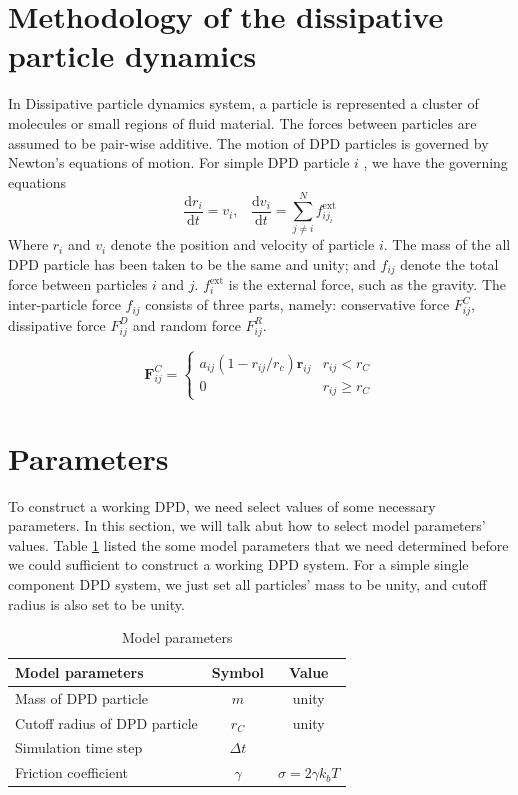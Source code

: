 \documentclass[12pt,a4paper]{article}   %
\begin{document}
\section{Methodology of the dissipative particle dynamics}     %
In Dissipative particle dynamics system, a particle is represented a cluster of molecules or small regions of fluid material. The forces between particles are assumed to be pair-wise additive. The motion of DPD particles is governed by Newton's equations of motion. For simple DPD particle $i$ , we have the governing equations
\begin{equation}
\frac{\mathrm{d}r_i}{\mathrm{d}t} = v_i,\,\,\,\,\,
\frac{\mathrm{d}v_i}{\mathrm{d}t} = \sum_{j\neq i}^N f_{ij_{i}}^{\mathrm{ext}}
\end{equation}
Where $r_i$ and $v_i$ denote the position and velocity of particle $i$. The mass of the all DPD particle has been taken to be the same and unity; and $f_{ij}$ denote the total force between particles $i$ and $j$. $f_i^{\mathrm{ext}}$ is the external force, such as the gravity. The inter-particle force $f_{ij}$ consists of three parts, namely: conservative force $F_{ij}^C$, dissipative force $F_{ij}^D$ and random force $F_{ij}^R$.

\begin{equation}
\mathbf{F}_{ij}^{C}=\begin{cases}
a_{ij}(1-r_{ij}/r_{c})\mathbf{\hat{r}}_{ij} & r_{ij}<r_{C}\\
0 & r_{ij}\geq r_{C}
\end{cases}
\end{equation}

\section{Parameters}

To construct a working DPD, we need select values of some necessary parameters. In this section, we will talk abut how to select model parameters' values. Table \ref{parameters} listed the some model parameters that we need determined before we could sufficient to construct a working DPD system. For a simple single component DPD system, we just set all particles' mass to be unity, and cutoff radius is also set to be unity.
\begin{table}[!htb]
\centering
\caption{\label{parameters}Model parameters}
\begin{tabular}{|l|l|l|}
\textbf{Model parameters} & \multicolumn{1}{c|}{\textbf{Symbol}} & \multicolumn{1}{c|}{\textbf{Value}} \\
\hline
Mass of DPD particle & \multicolumn{1}{c|}{$m$} & \multicolumn{1}{c|}{unity} \\
\hline
Cutoff radius of DPD particle & \multicolumn{1}{c|}{$r_C$} & \multicolumn{1}{c|}{unity} \\
\hline
Simulation time step & \multicolumn{1}{c|}{$\Delta t$} & \multicolumn{1}{c|}{} \\
\hline
Friction coefficient & \multicolumn{1}{c|}{$\gamma$} & \multicolumn{1}{c|}{$\sigma=2\gamma k_bT$} \\
\hline
\end{tabular}
\end{table}
\end{document}

